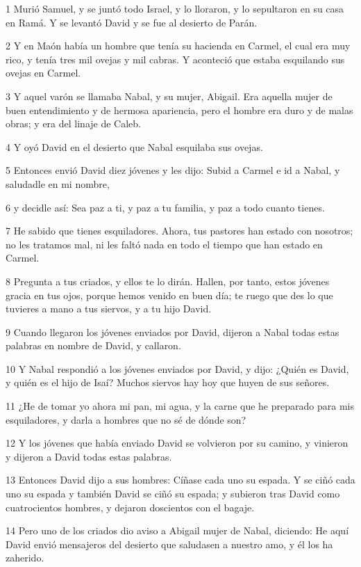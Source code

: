 \par 1 Murió Samuel, y se juntó todo Israel, y lo lloraron, y lo sepultaron en su casa en Ramá. Y se levantó David y se fue al desierto de Parán.
\par 2 Y en Maón había un hombre que tenía su hacienda en Carmel, el cual era muy rico, y tenía tres mil ovejas y mil cabras. Y aconteció que estaba esquilando sus ovejas en Carmel.
\par 3 Y aquel varón se llamaba Nabal, y su mujer, Abigail. Era aquella mujer de buen entendimiento y de hermosa apariencia, pero el hombre era duro y de malas obras; y era del linaje de Caleb.
\par 4 Y oyó David en el desierto que Nabal esquilaba sus ovejas.
\par 5 Entonces envió David diez jóvenes y les dijo: Subid a Carmel e id a Nabal, y saludadle en mi nombre,
\par 6 y decidle así: Sea paz a ti, y paz a tu familia, y paz a todo cuanto tienes.
\par 7 He sabido que tienes esquiladores. Ahora, tus pastores han estado con nosotros; no les tratamos mal, ni les faltó nada en todo el tiempo que han estado en Carmel.
\par 8 Pregunta a tus criados, y ellos te lo dirán. Hallen, por tanto, estos jóvenes gracia en tus ojos, porque hemos venido en buen día; te ruego que des lo que tuvieres a mano a tus siervos, y a tu hijo David.
\par 9 Cuando llegaron los jóvenes enviados por David, dijeron a Nabal todas estas palabras en nombre de David, y callaron.
\par 10 Y Nabal respondió a los jóvenes enviados por David, y dijo: ¿Quién es David, y quién es el hijo de Isaí? Muchos siervos hay hoy que huyen de sus señores.
\par 11 ¿He de tomar yo ahora mi pan, mi agua, y la carne que he preparado para mis esquiladores, y darla a hombres que no sé de dónde son?
\par 12 Y los jóvenes que había enviado David se volvieron por su camino, y vinieron y dijeron a David todas estas palabras.
\par 13 Entonces David dijo a sus hombres: Cíñase cada uno su espada. Y se ciñó cada uno su espada y también David se ciñó su espada; y subieron tras David como cuatrocientos hombres, y dejaron doscientos con el bagaje.
\par 14 Pero uno de los criados dio aviso a Abigail mujer de Nabal, diciendo: He aquí David envió mensajeros del desierto que saludasen a nuestro amo, y él los ha zaherido.
